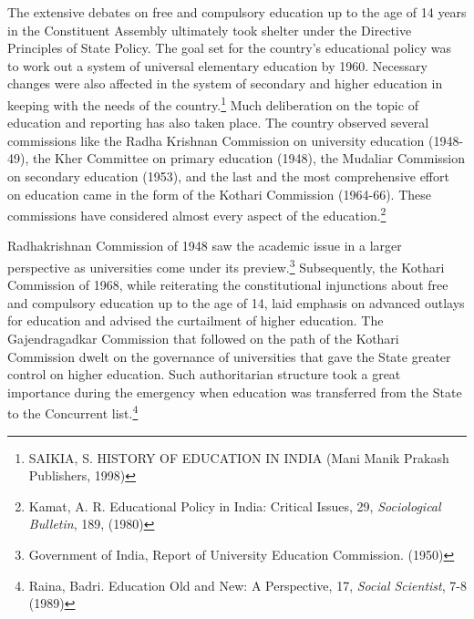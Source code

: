 \begin{multicols}{2}
\noi
The extensive debates on free and compulsory education up to the age of 14 years in the
Constituent Assembly ultimately took shelter under the Directive Principles of State Policy.
The goal set for the country’s educational policy was to work out a system of universal
elementary education by 1960. Necessary changes were also affected in the system of
secondary and higher education in keeping with the needs of the country.\footnote{SAIKIA, S. HISTORY OF EDUCATION IN INDIA (Mani Manik Prakash Publishers, 1998)} Much deliberation
on the topic of education and reporting has also taken place. The country observed several
commissions like the Radha Krishnan Commission on university education (1948-49), the
Kher Committee on primary education (1948), the Mudaliar Commission on secondary
education (1953), and the last and the most comprehensive effort on education came in the
form of the Kothari Commission (1964-66). These commissions have considered almost
every aspect of the education.\footnote{Kamat, A. R. Educational Policy in India: Critical Issues, 29, \textit{Sociological Bulletin}, 189, (1980)}

\noi
Radhakrishnan Commission of 1948 saw the academic issue in a larger perspective as
universities come under its preview.\footnote{Government of India, Report of University Education Commission. (1950)} Subsequently, the Kothari Commission of 1968, while
reiterating the constitutional injunctions about free and compulsory education up to the age of
14, laid emphasis on advanced outlays for education and advised the curtailment of higher
education. The Gajendragadkar Commission that followed on the path of the Kothari
Commission dwelt on the governance of universities that gave the State greater control on
higher education. Such authoritarian structure took a great importance during the emergency
when education was transferred from the State to the Concurrent list.\footnote{ Raina, Badri. Education Old and New: A Perspective, 17, \textit{Social Scientist}, 7-8 (1989)}


\end{multicols}
